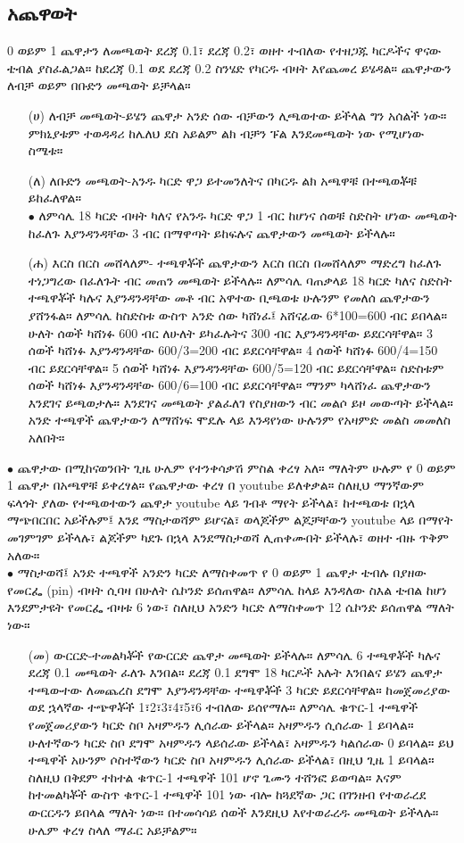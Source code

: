 \documentclass[a4paper,12pt]{article}
\newenvironment{geez}{\geezfont}{}
\begin{document}
\subsection{\begin{geez}አጨዋወት\end{geez}}
0 ወይም 1 ጨዋታን ለመጫወት ደረጃ 0.1፣ ደረጃ 0.2፣ ወዘተ ተብለው የተዘጋጁ ካርዶችና ዋናው ቴብል ያስፈልጋል። ከደረጃ 0.1 ወደ ደረጃ 0.2 ስንሄድ የካርዱ ብዛት እየጨመረ ይሄዳል። ጨዋታውን ለብቻ ወይም በቡድን መጫወት ይቻላል።
\begin{enumerate}
\item[(ሀ)]{\color{red}ለብቻ መጫወት}-ይሄን ጨዋታ አንድ ሰው ብቻውን ሊጫወተው ይችላል ግን አሰልች ነው። ምክኒያቱም ተወዳዳሪ ከሌለህ ደስ አይልም ልክ ብቻን ፑል እንደመጫወት ነው የሚሆነው ስሜቱ።
\end{enumerate}
\begin{enumerate}
\item[(ለ)] {\color{red}ለቡድን መጫወት}-አንዱ ካርድ ዋጋ ይተመንለትና በካርዱ ልክ አጫዋቹ በተጫወቾቹ ይከፈለዋል።\\
{\color{blue}$\bullet$} ለምሳሌ 18 ካርድ ብዛት ካለና የአንዱ ካርድ ዋጋ 1 ብር ከሆነና ሰወቹ ስድስት ሆነው መጫወት ከፈለጉ እያንዳንዳቸው 3 ብር በማዋጣት ይከፍሉና ጨዋታውን መጫወት ይችላሉ።
\end{enumerate}
\begin{enumerate}
\item[(ሐ)] {\color{red}እርስ በርስ መሸላለም}- ተጫዋቾች ጨዋታውን እርስ በርስ በመሸላለም ማድረግ ከፈለጉ ተነጋግረው በፈለጉት ብር መጠን መጫወት ይችላሉ። ለምሳሌ ባጠቃላይ 18 ካርድ ካለና ስድስት ተጫዋቾች ካሉና እያንዳንዳቸው መቶ ብር አዋተው ቢጫወቱ ሁሉንም የመለሰ ጨዋታውን ያሸንፋል። ለምሳሌ ከስድስቱ ውስጥ አንድ ሰው ካሸነፈ፤ አሸናፊው 6*100=600 ብር ይበላል። ሁለት ሰወች ካሸነፉ 600 ብር ለሁለት ይካፈሉትና 300 ብር እያንዳንዳቸው ይደርሳቸዋል። 3 ሰወች ካሸነፉ እያንዳንዳቸው 600/3=200 ብር ይደርሳቸዋል። 4 ሰወች ካሸነፉ 600/4=150 ብር ይደርሳቸዋል። 5 ሰወች ካሸነፉ እያንዳንዳቸው 600/5=120 ብር ይደርሳቸዋል። ስድስቱም ሰወች ካሸነፉ እያንዳንዳቸው 600/6=100 ብር ይደርሳቸዋል። ማንም ካላሸነፈ ጨዋታውን እንደገና ይጫወታሉ። እንደገና መጫወት ያልፈለገ የስያዘውን ብር መልሶ ይዞ መውጣት ይችላል። አንድ ተጫዋች ጨዋታውን ለማሸነፍ ሞዴሉ ላይ እንዳየነው ሁሉንም የአዛምድ መልስ መመለስ አለበት።
\end{enumerate}
{\color{blue}$\bullet$} ጨዋታው በሚከናወንበት ጊዜ ሁሌም የተንቀሳቃሽ ምስል ቀረፃ አለ። ማለትም ሁሉም የ 0 ወይም 1 ጨዋታ በአጫዋቹ ይቀረፃል። የጨዋታው ቀረፃ በ youtube ይለቀቃል። ስለዚህ ማንኛውም ፍላጎት ያለው የተጫወተውን ጨዋታ youtube ላይ ገብቶ ማየት ይችላል፣ ከተጫወቱ በኋላ ማጭበርበር አይችሉም፤ እንደ ማስታወሻም ይሆናል፣ ወላጆችም ልጆቻቸውን youtube ላይ በማየት መገምገም ይችላሉ፣ ልጆችም ካደጉ በኋላ እንደማስታወሻ ሊጠቀሙበት ይችላሉ፣ ወዘተ ብዙ ጥቅም አለው።\\
{\color{blue}$\bullet$} {\color{red}ማስታወሻ፤} አንድ ተጫዋች አንድን ካርድ ለማስቀመጥ የ 0 ወይም 1 ጨዋታ ቴብሉ በያዘው የመርፌ (pin) ብዛት ሲባዛ በሁለት ሴኮንድ ይሰጠዋል። ለምሳሌ ከላይ እንዳለው ስእል ቴብል ከሆነ እንደምታዩት የመርፌ ብዛቱ 6 ነው፣ ስለዚህ አንድን ካርድ ለማስቀመጥ 12 ሴኮንድ ይሰጠዋል ማለት ነው።
\begin{enumerate}
\item[(መ)] {\color{red}ውርርድ}-ተመልካቾች የውርርድ ጨዋታ መጫወት ይችላሉ። ለምሳሌ 6 ተጫዋቾች ካሉና ደረጃ 0.1 መጫወት ፈለጉ እንበል። ደረጃ 0.1 ደግሞ 18 ካርዶች አሉት እንበልና ይሄን ጨዋታ ተጫውተው ለመጨረስ ደግሞ እያንዳንዳቸው ተጫዋቾች 3 ካርድ ይደርሳቸዋል። ከመጀመሪያው ወደ ኋላኛው ተጭዋቾች 1፣2፣3፣4፣5፣6 ተብለው ይሰየማሉ። ለምሳሌ ቁጥር-1 ተጫዋች የመጀመሪያውን ካርድ ስቦ አዛምዱን ሊሰራው ይችላል። አዛምዱን ሲሰራው 1 ይባላል። ሁለተኛውን ካርድ ስቦ ደግሞ አዛምዱን ላይሰራው ይችላል፣ አዛምዱን ካልሰራው 0 ይባላል። ይህ ተጫዋች አሁንም ሶስተኛውን ካርድ ስቦ አዛምዱን ሊሰራው ይችላል፣ በዚህ ጊዜ 1 ይባላል። ስለዚህ በቅደም ተከተል ቁጥር-1 ተጫዋች 101 ሆኖ ጌሙን ተሸንፎ ይወጣል። እናም ከተመልካቾች ውስጥ ቁጥር-1 ተጫዋች 101 ነው ብሎ ከጓደኛው ጋር በገንዘብ የተወራረደ ውርርዱን ይበላል ማለት ነው። በተመሳሳይ ሰወች እንደዚህ እየተወራረዱ መጫወት ይችላሉ። ሁሌም ቀረፃ ስላለ ማፈር አይቻልም።
\end{enumerate}
\end{document}
